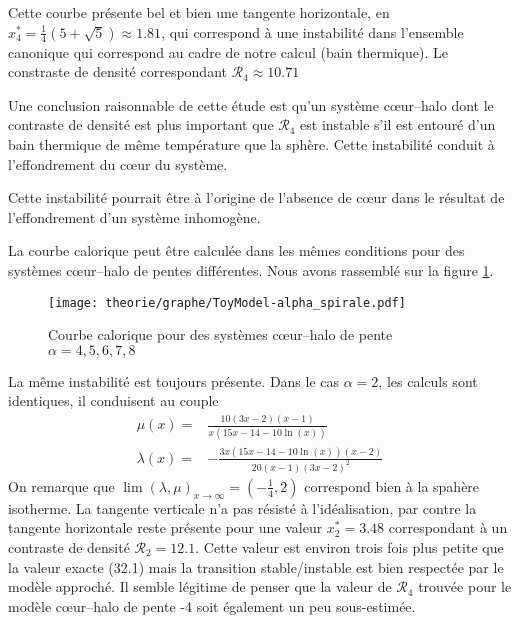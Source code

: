 Cette courbe présente bel et bien une tangente horizontale, en $x^*_4= \frac{1}{4} \left(5+\sqrt{5}\right) \approx 1.81$, qui correspond à une instabilité dans l'ensemble canonique qui correspond au cadre de notre calcul (bain thermique). Le constraste de densité correspondant  $\mathcal{R}_4\approx 10.71$

Une conclusion raisonnable de cette étude est qu'un système c\oe ur--halo dont le contraste de densité est plus important que $\mathcal{R}_4$ est instable s'il est entouré d'un bain thermique de même température que la sphère. Cette instabilité conduit à l'effondrement du c\oe ur du système.

Cette instabilité pourrait être à l'origine de l'absence de c\oe ur dans le résultat de l'effondrement d'un système inhomogène. 

La courbe calorique peut être calculée dans les mêmes conditions pour des systèmes c\oe ur--halo de pentes différentes. Nous avons rassemblé sur la figure \ref{ToyModel::AllAlpha}.
\begin{figure}
		\centering \texttt{[image: theorie/graphe/ToyModel-alpha\_spirale.pdf]}
		\caption{Courbe calorique pour des systèmes c\oe ur--halo de pente $\alpha=4, 5, 6, 7, 8$\label{ToyModel::AllAlpha}}
\end{figure} 
La même instabilité est toujours présente. Dans le cas $\alpha=2$, les calculs sont identiques, il conduisent au couple
\begin{eqnarray}
	\mu(x) =& \frac{10 (3x-2) (x-1)}{x(15x-14-10\ln(x))} \\
	\lambda(x) =& -\frac{3x(15x-14-10\ln(x))(x-2)}{20(x-1)(3x-2)^2}
\end{eqnarray}
On remarque que $\lim(\lambda,\mu)_{x\to\infty}=(-\frac{1}{4},2)$ correspond bien à la spahère isotherme. La tangente verticale n'a pas résisté à l'idéalisation, par contre la tangente horizontale reste présente pour une valeur $x^*_2=3.48$ correspondant à un contraste de densité $\mathcal{R}_2= 12.1$. Cette valeur est environ trois fois plus petite que la valeur exacte (32.1) mais la transition stable/instable est bien respectée par le modèle approché. Il semble légitime de penser que la valeur de $\mathcal{R}_4$ trouvée pour le modèle c\oe ur--halo de pente -4 soit également un peu sous-estimée.
